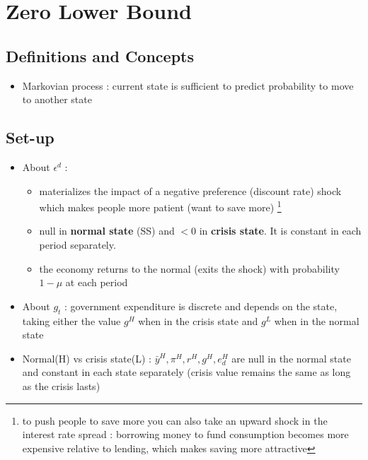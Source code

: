\documentclass{article}
\begin{document}
\section{Zero Lower Bound}

\subsection{Definitions and Concepts}

\begin{itemize}
    \item Markovian process : current state is sufficient to predict probability to move to another state 
\end{itemize}

\subsection{Set-up}
\begin{itemize}
    \item About $\epsilon^d$ : 
    \begin{itemize}
        \item materializes the impact of a negative preference (discount rate) shock which makes people more patient (want to save more) \footnote{to push people to save more you can also take an upward shock in the interest rate spread : borrowing money to fund consumption becomes more expensive relative to lending, which makes saving more attractive }
        \item null in \textbf{normal state} (SS) and $<0$ in \textbf{crisis state}. It is constant in each period separately. 
        \item the economy returns to the normal (exits the shock) with probability $1-\mu$ at each period
    \end{itemize}
    \item About $g_t$ : government expenditure is discrete and depends on the state, taking either the value $g^H$ when in the crisis state and $g^L$ when in the normal state
    \item Normal(H) vs crisis state(L) : $\bar{y}^H,\pi^H, r^H,g^H, e_d^H$ are null in the normal state and constant in each state separately (crisis value remains the same as long as the crisis lasts)
\end{itemize}
\end{document}
